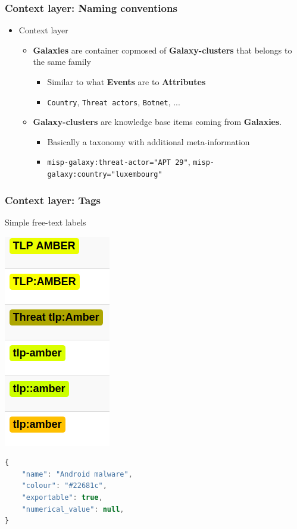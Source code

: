 \begin{frame}
    \frametitle{Context layer: Naming conventions}
     \begin{itemize}
            \item Context layer
            \begin{itemize}
                \item {\bf Galaxies} are container copmosed of {\bf Galaxy-clusters} that belongs to the same family
                \begin{itemize}
                    \item Similar to what {\bf Events} are to {\bf Attributes}
                    \item \texttt{Country}, \texttt{Threat actors}, \texttt{Botnet}, ...
                \end{itemize}

                \item {\bf Galaxy-clusters} are knowledge base items coming from {\bf Galaxies}.
                \begin{itemize}
                    \item Basically a taxonomy with additional meta-information
                    \item \texttt{misp-galaxy:threat-actor="APT 29"}, \texttt{misp-galaxy:country="luxembourg"}
                \end{itemize}
            \end{itemize}
    \end{itemize}
\end{frame}

\begin{frame}[fragile]
    \frametitle{Context layer: Tags}
    Simple free-text labels
    \begin{center}
        \includegraphics[scale=0.45]{screenshots/creativity.png}
    \end{center}
    \begin{lstlisting}[language=javascript,firstnumber=1]
{
    "name": "Android malware",
    "colour": "#22681c",
    "exportable": true,
    "numerical_value": null,
}
\end{lstlisting}
\end{frame}

